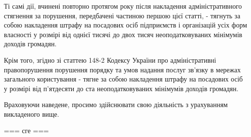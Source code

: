 Ті самі дії, вчинені повторно протягом року після накладення адміністративного
стягнення за порушення, передбачені частиною першою цієї статті, - тягнуть за
собою накладення штрафу на посадових осіб підприємств і організацій усіх форм
власності у розмірі від однієї тисячі до двох тисяч неоподатковуваних мінімумів
доходів громадян.

Крім того, згідно зі статтею 148-2 Кодексу України про адміністративні
правопорушення порушення порядку та умов надання послуг зв'язку в мережах
загального користування - тягне за собою накладення штрафу на посадових осіб у
розмірі від п'ятдесяти до ста неоподатковуваних мінімумів доходів громадян.

Враховуючи наведене, просимо здійснювати свою діяльність з урахуванням викладеного вище.

=== сге ===
